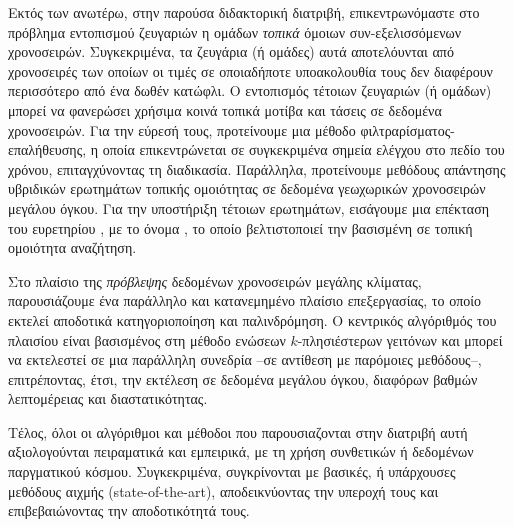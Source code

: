 Εκτός των ανωτέρω, στην παρούσα διδακτορική διατριβή, επικεντρωνόμαστε στο πρόβλημα εντοπισμού ζευγαριών η ομάδων \textit{τοπικά} όμοιων συν-εξελισσόμενων χρονοσειρών. Συγκεκριμένα, τα ζευγάρια (ή ομάδες) αυτά αποτελόυνται από χρονοσειρές των οποίων οι τιμές σε οποιαδήποτε υποακολουθία τους δεν διαφέρουν περισσότερο από ένα δωθέν κατώφλι. Ο εντοπισμός τέτοιων ζευγαριών (ή ομάδων) μπορεί να φανερώσει χρήσιμα κοινά τοπικά μοτίβα και τάσεις σε δεδομένα χρονοσειρών. Για την εύρεσή τους, προτείνουμε μια μέθοδο φιλτραρίσματος-επαλήθευσης, η οποία επικεντρώνεται σε συγκεκριμένα σημεία ελέγχου στο πεδίο του χρόνου, επιταγχύνοντας τη διαδικασία. Παράλληλα, προτείνουμε μεθόδους απάντησης υβριδικών ερωτημάτων τοπικής ομοιότητας σε δεδομένα γεωχωρικών χρονοσειρών μεγάλου όγκου. Για την υποστήριξη τέτοιων ερωτημάτων, εισάγουμε μια επέκταση του ευρετηρίου \btsr, με το όνομα \sbtsr, το οποίο βελτιστοποιεί την βασισμένη σε τοπική ομοιότητα αναζήτηση.

Στο πλαίσιο της \textit{πρόβλεψης} δεδομένων χρονοσειρών μεγάλης κλίματας, παρουσιάζουμε ένα παράλληλο και κατανεμημένο πλαίσιο επεξεργασίας, το οποίο εκτελεί αποδοτικά κατηγοριοποίηση και παλινδρόμηση. Ο κεντρικός αλγόριθμός του πλαισίου είναι βασισμένος στη μέθοδο ενώσεων $k$-πλησιέστερων γειτόνων και μπορεί να εκτελεστεί σε μια παράλληλη συνεδρία --σε αντίθεση με παρόμοιες μεθόδους--, επιτρέποντας, έτσι, την εκτέλεση σε δεδομένα μεγάλου όγκου, διαφόρων βαθμών λεπτομέρειας και διαστατικότητας.

Τέλος, όλοι οι αλγόριθμοι και μέθοδοι που παρουσιαζονται στην διατριβή αυτή αξιολογούνται πειραματικά και εμπειρικά, με τη χρήση συνθετικών ή δεδομένων παργματικού κόσμου. Συγκεκριμένα, συγκρίνονται με βασικές, ή υπάρχουσες μεθόδους αιχμής (state-of-the-art), αποδεικνύοντας την υπεροχή τους και επιβεβαιώνοντας την αποδοτικότητά τους.